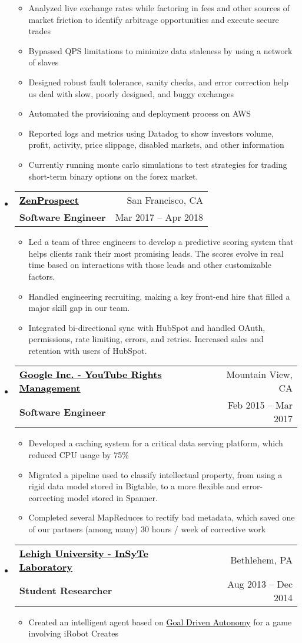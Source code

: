\documentclass[letterpaper,12pt]{article}
\makeatletter
\newcommand{\link}[2]{\href{#1}{\textcolor{black}{#2}}}
\newcommand{\resitem}[1]{\item #1 \vspace{-2pt}}
\newcommand{\ressubheading}[4]{
	\begin{tabular*}{6.5in}{l@{\extracolsep{\fill}}r}
			\textbf{#1} & #2 \\
			\textbf{#3} & #4 \\
	\end{tabular*}\vspace{-6pt}
}
\makeatother
\begin{document}
\begin{itemize}
            \begin{itemize}
                \resitem{Analyzed live exchange rates while factoring in fees and other sources of market friction to identify arbitrage opportunities and execute secure trades}
                \resitem{Bypassed QPS limitations to minimize data staleness by using a network of slaves}
				\resitem{Designed robust fault tolerance, sanity checks, and error correction help us deal with slow, poorly designed, and buggy exchanges}
				\resitem{Automated the provisioning and deployment process on AWS}
				\resitem{Reported logs and metrics using Datadog to show investors volume, profit, activity, price slippage, disabled markets, and other information}
				\resitem{Currently running monte carlo simulations to test strategies for trading short-term binary options on the forex market.}
            \end{itemize}
        \item \ressubheading
			{\link{https://www.zenprospect.com/}{ZenProspect}}
			{San Francisco, CA}
			{Software Engineer}
			{Mar 2017 -- Apr 2018}
				\begin{itemize}
					\resitem{Led a team of three engineers to develop a predictive scoring system that helps clients rank their most promising leads. The scores evolve in real time based on interactions with those leads and other customizable factors.}
					\resitem{Handled engineering recruiting, making a key front-end hire that filled a major skill gap in our team.}
					\resitem{Integrated bi-directional sync with HubSpot and handled OAuth, permissions, rate limiting, errors, and retries. Increased sales and retention with users of HubSpot.}
				\end{itemize}
        \item \ressubheading
            {\link{https://www.google.com/}{Google Inc. - YouTube Rights Management}}
            {Mountain View, CA}
            {Software Engineer}
            {Feb 2015 -- Mar 2017}
                \begin{itemize}
                    \resitem{Developed a caching system for a critical data serving platform, which reduced CPU usage by 75\%}
                    \resitem{Migrated a pipeline used to classify intellectual property, from using a rigid data model stored in Bigtable, to a more flexible and error-correcting model stored in Spanner.}
                    \resitem{Completed several MapReduces to rectify bad metadata, which saved one of our partners (among many) 30 hours / week of corrective work}
                \end{itemize}
		\item \ressubheading
            {\link{http://www.cse.lehigh.edu/}{Lehigh University - InSyTe Laboratory}}
            {Bethlehem, PA}
            {Student Researcher}
            {Aug 2013 -- Dec 2014}
				\begin{itemize}
					\resitem{Created an intelligent agent based on \link{http://www.cse.lehigh.edu/~munoz/projects/GDA/}{Goal Driven Autonomy} for a game involving iRobot Creates}
				\end{itemize}
               

\end{itemize}
\end{document}
